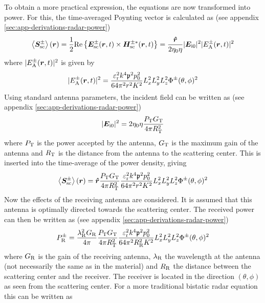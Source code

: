 \documentclass[11pt,twoside]{eitExjobb}
\begin{document}
	To obtain a more practical expression, the equations are now transformed into power. For this, the time-averaged Poynting vector is calculated as (see appendix \ref{sec:app-derivations-radar-power})
	\begin{equation*}
		\left< \bm{S}_{\mathrm{sc}}^\pm \right> (\bm{r}) = \frac{1}{2}\mathrm{Re}\left\{ \bm{E}_{\mathrm{sc}}^\pm (\bm{r},t) \times \bm{H}_{\mathrm{sc}}^{\pm*} (\bm{r},t) \right\} = \frac{\bm{\hat{r}}}{2\eta_0 \eta} |\bm{E}_{\mathrm{i}0}|^2 |E_{\mathrm{A}}^\pm (\bm{r},t)|^2
	\end{equation*}
	where $|E_{\mathrm{A}}^\pm (\bm{r},t)|^2$ is given by
	\begin{equation*}
		|E_{\mathrm{A}}^\pm (\bm{r},t)|^2 = \frac{\varepsilon_{\mathrm{r}}^2 k^4 \mathfrak{p}^2 p_0^2}{64\pi^2 r^2 K^2} L_{x}^2 L_{y}^2 L_{z}^2 \Phi^\pm (\theta,\phi)^2
	\end{equation*}
	Using standard antenna parameters, the incident field can be written as (see appendix \ref{sec:app-derivations-radar-power})
	\begin{equation*}
		|\bm{E}_{\mathrm{i}0}|^2 = 2\eta_0 \eta \frac{P_{\mathrm{T}} G_{\mathrm{T}}}{4\pi R_{\mathrm{T}}^2}
	\end{equation*}
	where $P_{\mathrm{T}}$ is the power accepted by the antenna, $G_{\mathrm{T}}$ is the maximum gain of the antenna and $R_{\mathrm{T}}$ is the distance from the antenna to the scattering center. This is inserted into the time-average of the power density, giving
	\begin{equation*}
		\left< \bm{S}_{\mathrm{sc}}^\pm \right> (\bm{r}) = \bm{\hat{r}} \frac{P_{\mathrm{T}} G_{\mathrm{T}}}{4\pi R_{\mathrm{T}}^2} \frac{\varepsilon_{\mathrm{r}}^2 k^4 \mathfrak{p}^2 p_0^2}{64\pi^2 r^2 K^2} L_{x}^2 L_{y}^2 L_{z}^2 \Phi^\pm (\theta,\phi)^2
	\end{equation*}
	Now the effects of the receiving antenna are considered. It is assumed that this antenna is optimally directed towards the scattering center. The received power can then be written as (see appendix \ref{sec:app-derivations-radar-power})
	\begin{equation*}
		P_{\mathrm{R}}^\pm = \frac{\lambda_{\mathrm{R}}^2 G_{\mathrm{R}}}{4\pi} \frac{P_{\mathrm{T}} G_{\mathrm{T}}}{4\pi R_{\mathrm{T}}^2} \frac{\varepsilon_{\mathrm{r}}^2 k^4 \mathfrak{p}^2 p_0^2}{64\pi^2 R_{\mathrm{R}}^2 K^2} L_{x}^2 L_{y}^2 L_{z}^2 \Phi^\pm (\theta,\phi)^2
	\end{equation*}
	where $G_{\mathrm{R}}$ is the gain of the receiving antenna, $\lambda_{\mathrm{R}}$ the wavelength at the antenna (not necessarily the same as in the material) and $R_{\mathrm{R}}$ the distance between the scattering center and the receiver. The receiver is located in the direction $(\theta,\phi)$ as seen from the scattering center. For a more traditional bistatic radar equation \cite{Richards2012} this can be written as
\end{document}
